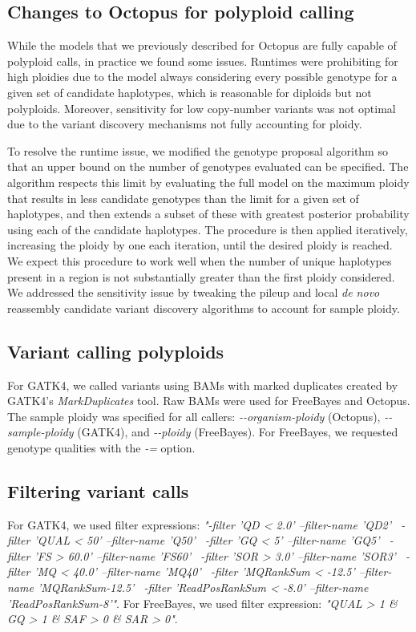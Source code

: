 \documentclass[notitlepage, twocolumn, 10pt]{article}
\begin{document}
\subsection*{Changes to Octopus for polyploid calling}

While the models that we previously described for Octopus \cite{RN663} are fully capable of polyploid calls, in practice we found some issues. Runtimes were prohibiting for high ploidies due to the model always considering every possible genotype for a given set of candidate haplotypes, which is reasonable for diploids but not polyploids. Moreover, sensitivity for low copy-number variants was not optimal due to the variant discovery mechanisms not fully accounting for ploidy.

To resolve the runtime issue, we modified the genotype proposal algorithm so that an upper bound on the number of genotypes evaluated can be specified. The algorithm respects this limit by evaluating the full model on the maximum ploidy that results in less candidate genotypes than the limit for a given set of haplotypes, and then extends a subset of these with greatest posterior probability using each of the candidate haplotypes. The procedure is then applied iteratively, increasing the ploidy by one each iteration, until the desired ploidy is reached. We expect this procedure to work well when the number of unique haplotypes present in a region is not substantially greater than the first ploidy considered. We addressed the sensitivity issue by tweaking the pileup and local \emph{de novo} reassembly candidate variant discovery algorithms to account for sample ploidy.

\subsection*{Variant calling polyploids} For GATK4, we called variants using BAMs with marked duplicates created by GATK4's \emph{MarkDuplicates} tool. Raw BAMs were used for FreeBayes and Octopus. The sample ploidy was specified for all callers: \emph{-{}-organism-ploidy} (Octopus), \emph{-{}-sample-ploidy} (GATK4), and \emph{-{}-ploidy} (FreeBayes). For FreeBayes, we requested genotype qualities with the \emph{-=} option.

\subsection*{Filtering variant calls} For GATK4, we used filter expressions: \emph{"-filter 'QD < 2.0' --filter-name 'QD2' \
		 -filter 'QUAL < 50' --filter-name 'Q50' \
		 -filter 'GQ < 5' --filter-name 'GQ5' \
		 -filter 'FS > 60.0' --filter-name 'FS60' \
		 -filter 'SOR > 3.0' --filter-name 'SOR3' \
		 -filter 'MQ < 40.0' --filter-name 'MQ40' \
		 -filter 'MQRankSum < -12.5' --filter-name 'MQRankSum-12.5' \
		 -filter 'ReadPosRankSum < -8.0' --filter-name 'ReadPosRankSum-8'"}.
For FreeBayes, we used filter expression: \emph{"QUAL > 1 \& GQ > 1 \& SAF > 0 \& SAR > 0"}.
\end{document}
